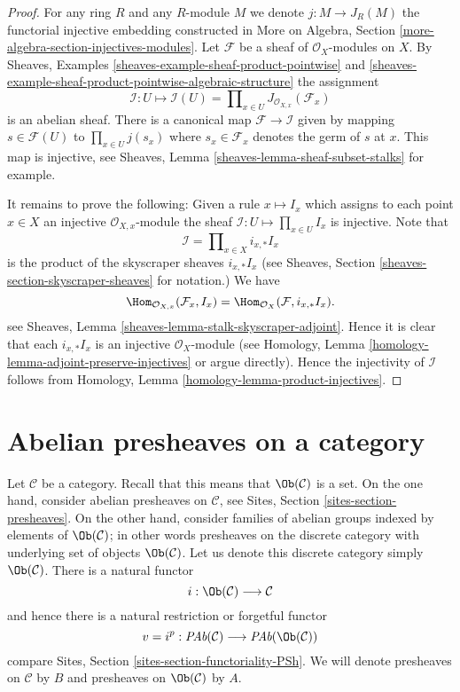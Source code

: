 \begin{proof}
For any ring $R$ and any $R$-module $M$ we denote
$j : M \to J_R(M)$ the functorial
injective embedding constructed in
More on Algebra, Section \ref{more-algebra-section-injectives-modules}.
Let $\mathcal{F}$ be a sheaf of $\mathcal{O}_X$-modules on $X$.
By Sheaves, Examples \ref{sheaves-example-sheaf-product-pointwise}
and \ref{sheaves-example-sheaf-product-pointwise-algebraic-structure}
the assignment
$$
\mathcal{I} : U \mapsto
\mathcal{I}(U) = \prod\nolimits_{x\in U} J_{\mathcal{O}_{X, x}}(\mathcal{F}_x)
$$
is an abelian sheaf.
There is a canonical map $\mathcal{F} \to \mathcal{I}$
given by mapping $s \in \mathcal{F}(U)$ to $\prod_{x \in U} j(s_x)$
where $s_x \in \mathcal{F}_x$ denotes the germ of $s$ at $x$.
This map is injective, see
Sheaves, Lemma \ref{sheaves-lemma-sheaf-subset-stalks}
for example.

\medskip\noindent
It remains to prove the following: Given a rule
$x \mapsto I_x$ which assigns to each point $x \in X$ an injective
$\mathcal{O}_{X, x}$-module
the sheaf $\mathcal{I} : U \mapsto \prod_{x \in U} I_x$
is injective. Note that
$$
\mathcal{I} = \prod\nolimits_{x \in X} i_{x, *}I_x
$$
is the product of the skyscraper sheaves $i_{x, *}I_x$ (see
Sheaves, Section \ref{sheaves-section-skyscraper-sheaves} for notation.)
We have
$$
\Hom_{\mathcal{O}_{X, x}}(\mathcal{F}_x, I_x)
=
\Hom_{\mathcal{O}_X}(\mathcal{F}, i_{x, *}I_x).
$$
see Sheaves, Lemma \ref{sheaves-lemma-stalk-skyscraper-adjoint}. Hence it is
clear that each $i_{x, *}I_x$ is an injective $\mathcal{O}_X$-module
(see Homology, Lemma \ref{homology-lemma-adjoint-preserve-injectives} or argue
directly). Hence the injectivity of $\mathcal{I}$ follows from
Homology, Lemma \ref{homology-lemma-product-injectives}.
\end{proof}













\section{Abelian presheaves on a category}
\label{section-injectives-presheaves}

\noindent
Let $\mathcal{C}$ be a category. Recall that this means that
$\Ob(\mathcal{C})$ is a set. On the one hand, consider abelian
presheaves on $\mathcal{C}$, see
Sites, Section \ref{sites-section-presheaves}.
On the other hand, consider families of abelian groups
indexed by elements of $\Ob(\mathcal{C})$; in other
words presheaves on the discrete category with underlying set
of objects $\Ob(\mathcal{C})$. Let us denote this
discrete category simply $\Ob(\mathcal{C})$.
There is a natural functor
$$
i : \Ob(\mathcal{C}) \longrightarrow \mathcal{C}
$$
and hence there is a natural restriction or forgetful functor
$$
v = i^p :
\textit{PAb}(\mathcal{C})
\longrightarrow
\textit{PAb}(\Ob(\mathcal{C}))
$$
compare Sites, Section \ref{sites-section-functoriality-PSh}.
We will denote presheaves
on $\mathcal{C}$ by $B$ and presheaves on
$\Ob(\mathcal{C})$ by $A$.

